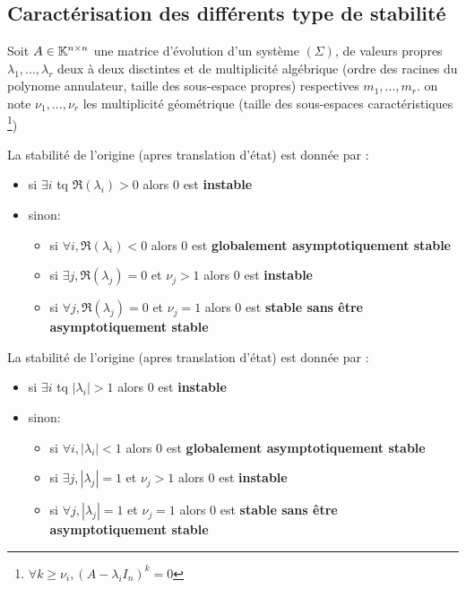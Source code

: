 \documentclass[main.tex]{subfiles}
\begin{document}
\subsection{Caractérisation des différents type de stabilité}
Soit $A \in \mathbb{K}^{n\times n}$ une matrice d'évolution d'un système $(\Sigma)$, de valeurs propres $\lambda_1, ..., \lambda_r$ deux à deux disctintes et de multiplicité algébrique (ordre des racines du polynome annulateur, taille des sous-espace propres) respectives $m_1, ... ,m_r $. on note $\nu_1 ,...,\nu_r$ les multiplicité géométrique (taille des sous-espaces caractéristiques \footnote{$\forall k\ge \nu_i , (A-\lambda_iI_n)^k = 0$})
\begin{thm}
  La stabilité de l'origine (apres translation d'état) est donnée par :
  \begin{itemize}
  \item si $\exists i $ tq $\Re(\lambda_i)>0 $ alors 0 est \textbf{instable}
  \item sinon:
    \begin{itemize}
    \item si $\forall i , \Re(\lambda_i)<0$ alors 0 est \textbf{globalement asymptotiquement stable}
    \item si $\exists j, \Re(\lambda_j) = 0 $ et $\nu_j>1$ alors 0 est \textbf{instable}
    \item si $\forall j, \Re(\lambda_j) = 0 $ et $\nu_j=1$ alors 0 est \textbf{stable sans être asymptotiquement stable}
    \end{itemize}
  \end{itemize}
\end{thm}

\begin{thm}
  La stabilité de l'origine (apres translation d'état) est donnée par :
  \begin{itemize}
  \item si $\exists i $ tq $|\lambda_i| > 1  $ alors 0 est \textbf{instable}
  \item sinon:
    \begin{itemize}
    \item si $\forall i , |\lambda_i|<1$ alors 0 est \textbf{globalement asymptotiquement stable}
    \item si $\exists j, |\lambda_j| = 1 $ et $\nu_j>1$ alors 0 est \textbf{instable}
    \item si $\forall j, |\lambda_j| =1 $ et $\nu_j=1$ alors 0 est \textbf{stable sans être asymptotiquement stable}
    \end{itemize}
  \end{itemize}
\end{thm}
\end{document}
